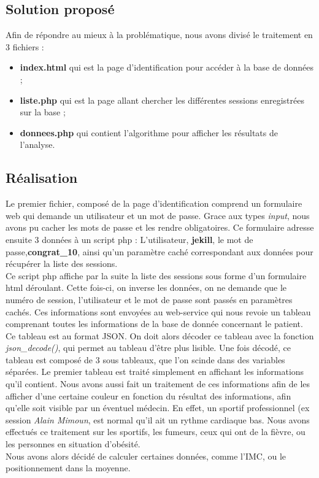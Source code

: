 	\subsection{Solution proposé}
Afin de répondre au mieux à la problématique, nous avons divisé le traitement en 3 fichiers :
\begin{itemize}
\item \textbf{index.html} qui est la page d'identification pour accéder à la base de données ;
\item \textbf{liste.php} qui est la page allant chercher les différentes sessions enregistrées sur la base ;
\item \textbf{donnees.php} qui contient l'algorithme pour afficher les résultats de l'analyse.
\end{itemize}

	\subsection{Réalisation}
Le premier fichier, composé de la page d'identification comprend un formulaire web qui demande un utilisateur et un mot de passe. Grace aux types \textit{input}, nous avons pu cacher les mots de passe et les rendre obligatoires.
Ce formulaire adresse ensuite 3 données à un script php : L'utilisateur, \textbf{jekill}, le mot de passe,\textbf{congrat\_10}, ainsi qu'un paramètre caché correspondant aux données pour récupérer la liste des sessions.
\\
Ce script php affiche par la suite la liste des sessions sous forme d'un formulaire html déroulant.
Cette fois-ci, on inverse les données, on ne demande que le numéro de session, l'utilisateur et le mot de passe sont passés en paramètres cachés.
Ces informations sont envoyées au web-service qui nous revoie un tableau comprenant toutes les informations de la base de donnée concernant le patient.
\\

Ce tableau est au format JSON. On doit alors décoder ce tableau avec la fonction \textit{json\_decode()}, qui permet au tableau d'être plus lisible. Une fois décodé, ce tableau est composé de 3 sous tableaux, que l'on scinde dans des variables séparées. Le premier tableau est traité simplement en affichant les informations qu'il contient. Nous avons aussi fait un traitement de ces informations afin de les afficher d'une certaine couleur en fonction du résultat des informations, afin qu'elle soit visible par un éventuel médecin. En effet, un sportif professionnel (ex session \textit{Alain Mimoun}, est normal qu'il ait un rythme cardiaque bas. Nous avons effectués ce traitement sur les sportifs, les fumeurs, ceux qui ont de la fièvre, ou les personnes en situation d'obésité. \\
Nous avons alors décidé de calculer certaines données, comme l'IMC, ou le positionnement dans la moyenne.
\newpage

